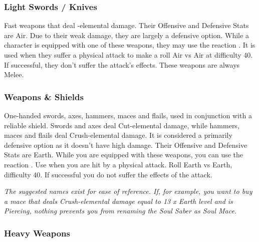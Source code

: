 \subsubsection{Light Swords / Knives}

Fast weapons that deal -elemental damage.  Their Offensive and Defensive Stats are Air.  Due to their weak damage, they are largely a defensive option.  While a character is equipped with one of these weapons, they may use the reaction .  It is used when they suffer a physical attack to make a roll Air vs Air at difficulty 40.  If successful, they don't suffer the attack's effects.  These weapons are always Melee.

\begin{tabwpn}[label=inv-lsword,range=melee,type=physical,element=puncture,roll=airvair]
    
\end{tabwpn}
\clearpage

\subsubsection{Weapons \& Shields}

One-handed swords, axes, hammers, maces and flails, used in conjunction with a reliable shield. Swords and axes deal Cut-elemental damage, while hammers, maces and flails deal Crush-elemental damage. It is considered a primarily defensive option as it doesn’t have high damage. Their Offensive and Defensive Stats are Earth. While you are equipped with these weapons, you can use the reaction . Use when you are hit by a physical attack. Roll Earth vs Earth, difficulty 40. If successful you do not suffer the effects of the attack.

\begin{tabwpn}[label=inv-hwpnshld,range=melee,type=physical,element=crush / cut,roll=earthvearth]
    
\end{tabwpn}
{\footnotesize\textit{The suggested names exist for ease of reference. If, for example, you want to buy a mace that deals Crush-elemental damage equal to 13 x Earth level and is Piercing, nothing prevents you from renaming the Soul Saber as Soul Mace.}}
\clearpage

\subsubsection{Heavy Weapons}

